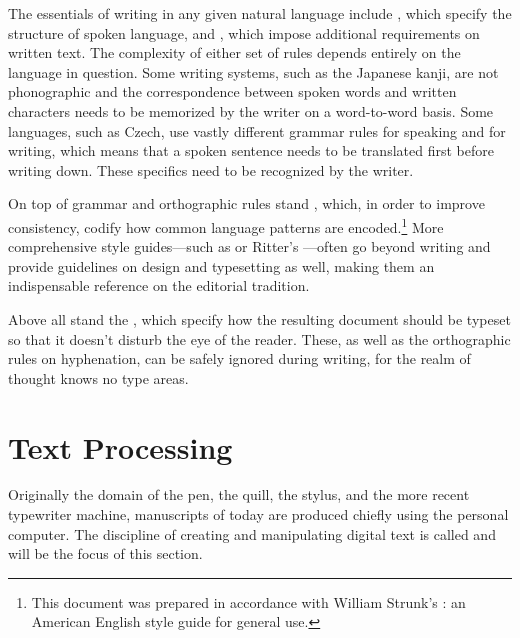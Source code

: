 \documentclass{book}
\begin{document}
The essentials of writing in any given natural language include , which specify the structure of spoken language, and
, which impose additional
requirements on written text. The complexity of either set of rules depends
entirely on the language in question. Some writing systems, such as the Japanese
kanji, are not phonographic and the correspondence between spoken words and
written characters needs to be memorized by the writer on a word-to-word
basis. Some languages, such as Czech, use vastly different grammar rules for
speaking and for writing, which means that a spoken sentence needs to be
translated first before writing down. These specifics need to be recognized by
the writer.

On top of grammar and orthographic rules stand , which, in order to improve consistency, codify how common language
patterns are encoded.\footnote{
  This document was prepared in accordance with William Strunk's : an American English style guide for general use.
} More comprehensive style guides---such as 
or Ritter's ---often go beyond writing and provide
guidelines on design and typesetting as well, making them an indispensable
reference on the editorial tradition.

Above all stand the , which
specify how the resulting document should be typeset so that it doesn't disturb
the eye of the reader. These, as well as the orthographic rules on hyphenation,
can be safely ignored during writing, for the realm of thought knows no type
areas.


\section{Text Processing}
Originally the domain of the pen, the quill, the stylus, and the more recent
typewriter machine, manuscripts of today are produced chiefly using the personal
computer. The discipline of creating and manipulating digital text is called
 and will be the focus of this section.
\end{document}
